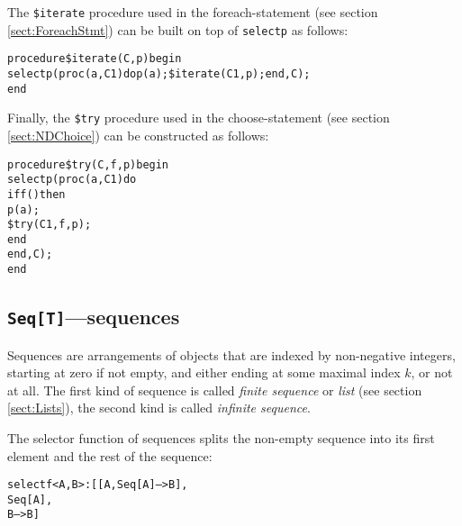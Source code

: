 
The {\tt \$iterate} procedure used in the foreach-statement (see
section \ref{sect:ForeachStmt}) can be built on top of {\tt selectp}
as follows:

\begin{alltt}procedure \$iterate (C, p) begin
    selectp(proc (a, C1) do p(a); \$iterate(C1, p); end, C);
end
\end{alltt}



Finally, the {\tt \$try} procedure used in the choose-statement (see
section \ref{sect:NDChoice}) can be constructed as follows:

\begin{alltt}procedure \$try (C, f, p) begin
    selectp(proc (a, C1) do
                if f() then
                    p(a);
                    \$try(C1, f, p);
                end
            end, C);
end
\end{alltt}




\subsection{{\tt Seq[T]}---sequences}\label{sect:Sequences}



Sequences are arrangements of objects that are indexed by non-negative
integers, starting at zero if not empty, and either ending at some maximal index
$k$, or not at all. The first kind of sequence is called {\em finite
  sequence} or {\em list} (see section \ref{sect:Lists}), the second
kind is called {\em infinite sequence}.


The selector function of sequences splits the non-empty
sequence into its first element and the rest of the sequence:
\begin{alltt}  selectf<A, B>: [[A, Seq[A] --> B], 
                  Seq[A], 
                  B --> B]
\end{alltt}

